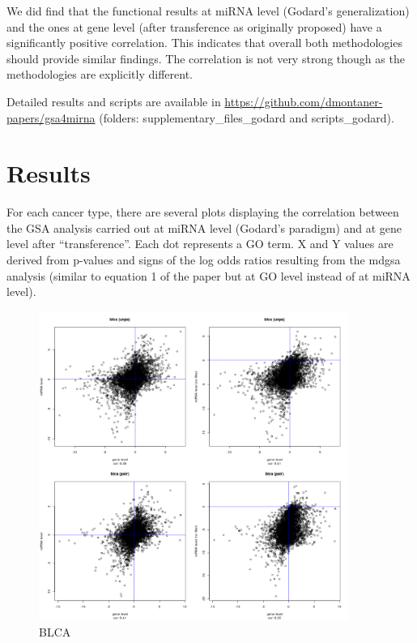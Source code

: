 \documentclass[a4paper,12pt]{article}
\begin{document}
We did find that the functional results at miRNA level (Godard's generalization) and the ones at gene level (after transference as originally proposed)
have a significantly positive correlation. This indicates that overall both methodologies should provide
similar findings. The correlation is not very strong though as the methodologies are explicitly different.

Detailed results and scripts are available in \url{https://github.com/dmontaner-papers/gsa4mirna}
(folders: supplementary\_files\_godard and scripts\_godard).


\clearpage



\section{Results}

For each cancer type, there are several plots displaying the correlation between the GSA analysis carried out at miRNA level (Godard’s paradigm)
 and at gene level after “transference”. Each dot represents a GO term. 
 X and Y values are derived from p-values and signs of the log odds ratios resulting from the mdgsa analysis
  (similar to equation 1 of the paper but at GO level instead of at miRNA level).

  
  
\begin{figure}[!h] 
\centering 
\includegraphics[width=0.9\textwidth]{plots/gene_vs_mirna_level_gsa_blca.png} 
\caption{BLCA} 
\end{figure} 
\end{document}

